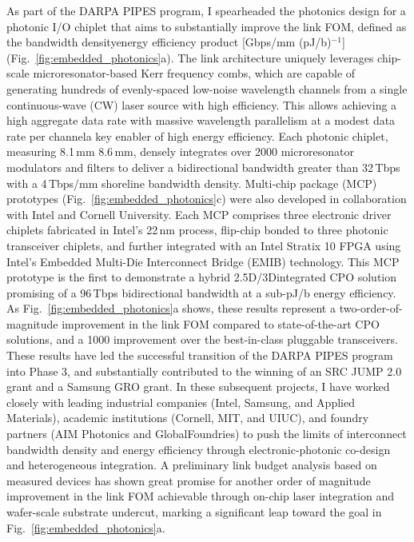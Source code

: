 As part of the DARPA PIPES program, I spearheaded the photonics design for a photonic I/O chiplet that aims to substantially improve the link FOM, defined as the bandwidth density\textendash{}energy efficiency product [Gbps/mm \texttimes{} (pJ/b)$^{-1}$] (Fig.~\ref{fig:embedded_photonics}a). The link architecture uniquely leverages chip-scale microresonator-based Kerr frequency combs, which are capable of generating hundreds of evenly-spaced low-noise wavelength channels from a single continuous-wave (CW) laser source with high efficiency. This allows achieving a high aggregate data rate with massive wavelength parallelism at a modest data rate per channel\textemdash{}a key enabler of high energy efficiency. Each photonic chiplet, measuring 8.1\,mm \texttimes{} 8.6\,mm, densely integrates over \num{2000} microresonator modulators and filters to deliver a bidirectional bandwidth greater than 32\,Tbps with a 4\,Tbps/mm shoreline bandwidth density. Multi-chip package (MCP) prototypes (Fig.~\ref{fig:embedded_photonics}c) were also developed in collaboration with Intel and Cornell University. Each MCP comprises three electronic driver chiplets fabricated in Intel's 22\,nm process, flip-chip bonded to three photonic transceiver chiplets, and further integrated with an Intel Stratix 10 FPGA using Intel's Embedded Multi-Die Interconnect Bridge (EMIB) technology. This MCP prototype is the first to demonstrate a hybrid 2.5D/3D\textendash{}integrated CPO solution promising of a 96\,Tbps bidirectional bandwidth at a sub-pJ/b energy efficiency. As Fig.~\ref{fig:embedded_photonics}a shows, these results represent a two-order-of-magnitude improvement in the link FOM compared to state-of-the-art CPO solutions, and a \num{1000}\texttimes{} improvement over the best-in-class pluggable transceivers. These results have led the successful transition of the DARPA PIPES program into Phase 3, and substantially contributed to the winning of an SRC JUMP 2.0 grant and a Samsung GRO grant. In these subsequent projects, I have worked closely with leading industrial companies (Intel, Samsung, and Applied Materials), academic institutions (Cornell, MIT, and UIUC), and foundry partners (AIM Photonics and GlobalFoundries) to push the limits of interconnect bandwidth density and energy efficiency through electronic-photonic co-design and heterogeneous integration. A preliminary link budget analysis based on measured devices has shown great promise for another order of magnitude improvement in the link FOM achievable through on-chip laser integration and wafer-scale substrate undercut, marking a significant leap toward the goal in Fig.~\ref{fig:embedded_photonics}a.


